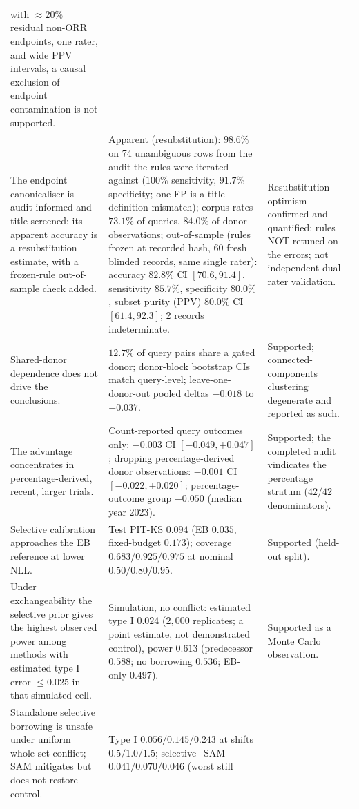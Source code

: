 \documentclass[11pt]{article}
\begin{document}
\begin{longtable}{p{} p{} p{}}
with $\approx 20\%$ residual non-ORR endpoints, one rater, and wide PPV
intervals, a causal exclusion of endpoint contamination is not
supported. \\
The endpoint canonicaliser is audit-informed and title-screened; its
apparent accuracy is a resubstitution estimate, with a frozen-rule
out-of-sample check added. & Apparent (resubstitution): $98.6\%$ on 74
unambiguous rows from the audit the rules were iterated against ($100\%$
sensitivity, $91.7\%$ specificity; one FP is a title--definition
mismatch); corpus rates $73.1\%$ of queries, $84.0\%$ of donor
observations; out-of-sample (rules frozen at recorded hash, 60 fresh
blinded records, same single rater): accuracy $82.8\%$ CI $[70.6,91.4]$,
sensitivity $85.7\%$, specificity $80.0\%$, subset purity (PPV) $80.0\%$
CI $[61.4,92.3]$; 2 records indeterminate. & Resubstitution optimism
confirmed and quantified; rules NOT retuned on the errors; not
independent dual-rater validation. \\
Shared-donor dependence does not drive the conclusions. & $12.7\%$ of query
pairs share a gated donor; donor-block bootstrap CIs match query-level;
leave-one-donor-out pooled deltas $-0.018$ to $-0.037$. & Supported;
connected-components clustering degenerate and reported as such. \\
The advantage concentrates in percentage-derived, recent, larger trials. &
Count-reported query outcomes only: $-0.003$ CI $[-0.049,+0.047]$; dropping
percentage-derived donor observations: $-0.001$ CI $[-0.022,+0.020]$;
percentage-outcome group $-0.050$ (median year 2023). & Supported; the
completed audit vindicates the percentage stratum ($42/42$ denominators). \\
Selective calibration approaches the EB reference at lower NLL. & Test PIT-KS
$0.094$ (EB $0.035$, fixed-budget $0.173$); coverage $0.683/0.925/0.975$ at
nominal $0.50/0.80/0.95$. & Supported (held-out split). \\
Under exchangeability the selective prior gives the highest observed power
among methods with estimated type I error $\le 0.025$ in that simulated
cell. & Simulation, no conflict: estimated type I $0.024$ ($2{,}000$
replicates; a point estimate, not demonstrated control), power
$0.613$ (predecessor $0.588$; no borrowing $0.536$; EB-only $0.497$). &
Supported as a Monte Carlo observation. \\
Standalone selective borrowing is unsafe under uniform whole-set conflict;
SAM mitigates but does not restore control. & Type I $0.056/0.145/0.243$ at
shifts $0.5/1.0/1.5$; selective+SAM $0.041/0.070/0.046$ (worst still

\end{longtable}
\end{document}
